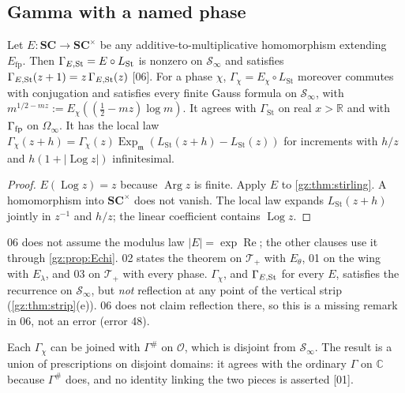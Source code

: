 \documentclass[11pt,a4paper]{article}
\numberwithin{equation}{section}
\theoremstyle{definition}
\theoremstyle{remark}
\newcommand{\SC}{\mathbf{SC}}
\newcommand{\R}{\mathbb R}
\newcommand{\C}{\mathbb C}
\newcommand{\OO}{\mathcal O}
\newcommand{\mm}{\mathfrak m}
\renewcommand{\Re}{\operatorname{Re}}
\newcommand{\Arg}{\operatorname{Arg}}
\newcommand{\Log}{\operatorname{Log}}
\newcommand{\Ex}{\operatorname{Exp}_{\mm}}
\newcommand{\Efp}{E_{\mathrm{fp}}}
\newcommand{\LSt}{L_{\mathrm{St}}}
\newcommand{\GSt}{\Gamma_{\mathrm{St}}}
\newcommand{\Gp}{\Gamma^{\#}}
\newcommand{\Tp}{\mathcal T_{+}}
\newcommand{\Sinf}{\mathcal S_{\infty}}
\newcommand{\Om}{\Omega_{\infty}}
\newcommand{\src}[1]{\textup{[#1]}}
\begin{document}
\subsection{Gamma with a named phase}\label{gz:sec:gammachi}
\begin{proposition}[Phase Gamma on $\Sinf$ \src{01, 02, 03, 06}]\label{gz:prop:gammachi}
Let $E:\SC\to\SC^\times$ be any additive-to-multiplicative homomorphism
extending $\Efp$. Then $\Gamma_{E,\rm St}=E\circ\LSt$ is nonzero on $\Sinf$ and
satisfies $\Gamma_{E,\rm St}(z+1)=z\,\Gamma_{E,\rm St}(z)$ \src{06}. For a
phase $\chi$, $\Gamma_\chi=E_\chi\circ\LSt$ moreover commutes with
conjugation and satisfies every finite Gauss formula on $\Sinf$, with
$m^{1/2-mz}:=E_\chi((\tfrac12-mz)\log m)$. It agrees with $\GSt$ on real
$x>\R$ and with $\Gamma_{\rm fp}$ on $\Om$. It has the local law
$\Gamma_\chi(z+h)=\Gamma_\chi(z)\Ex(\LSt(z+h)-\LSt(z))$ for increments with
$h/z$ and $h(1+|\Log z|)$ infinitesimal.
\end{proposition}
\begin{proof}
$E(\Log z)=z$ because $\Arg z$ is finite. Apply $E$ to
\cref{gz:thm:stirling}. A homomorphism into $\SC^\times$ does not vanish. The
local law expands $\LSt(z+h)$ jointly in $z^{-1}$ and $h/z$; the linear
coefficient contains $\Log z$.
\end{proof}
06 does not assume the modulus law $|E|=\exp\Re$; the other clauses use it
through \cref{gz:prop:Echi}. 02 states the theorem on $\Tp$ with $E_\theta$,
01 on the wing with $E_\lambda$, and 03 on $\Tp$ with every phase.
$\Gamma_\chi$, and $\Gamma_{E,\rm St}$ for every $E$, satisfies the
recurrence on $\Sinf$, but \emph{not} reflection at any point of the
vertical strip (\cref{gz:thm:strip}(e)). 06 does not claim reflection
there, so this is a missing remark in 06, not an error (error 48).

Each $\Gamma_\chi$ can be joined with $\Gp$ on $\OO$, which is disjoint from
$\Sinf$. The result is a union of prescriptions on disjoint domains: it
agrees with the ordinary $\Gamma$ on $\C$ because $\Gp$ does, and no
identity linking the two pieces is asserted \src{01}.
\end{document}
